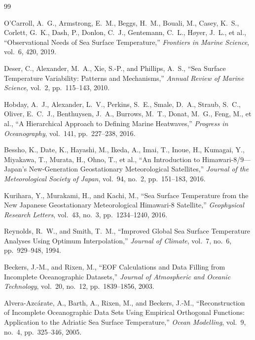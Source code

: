 \documentclass[12pt,reqno]{amsart}
\begin{document}
%
\renewcommand\refname{\vskip -1cm}


\begin{thebibliography}{99}


O'Carroll, A.~G., Armstrong, E.~M., Beggs, H.~M., Bouali, M., Casey, K.~S., Corlett, G.~K., Dash, P., Donlon, C.~J., Gentemann, C.~L., H{\o}yer, J.~L., et al.,
``Observational Needs of Sea Surface Temperature,''
\textit{Frontiers in Marine Science}, vol.~6, 420, 2019.

Deser, C., Alexander, M.~A., Xie, S.-P., and Phillips, A.~S.,
``Sea Surface Temperature Variability: Patterns and Mechanisms,''
\textit{Annual Review of Marine Science}, vol.~2, pp.~115--143, 2010.

Hobday, A.~J., Alexander, L.~V., Perkins, S.~E., Smale, D.~A., Straub, S.~C., Oliver, E.~C.~J., Benthuysen, J.~A., Burrows, M.~T., Donat, M.~G., Feng, M., et al.,
``A Hierarchical Approach to Defining Marine Heatwaves,''
\textit{Progress in Oceanography}, vol.~141, pp.~227--238, 2016.

Bessho, K., Date, K., Hayashi, M., Ikeda, A., Imai, T., Inoue, H., Kumagai, Y., Miyakawa, T., Murata, H., Ohno, T., et al.,
``An Introduction to Himawari-8/9---Japan's New-Generation Geostationary Meteorological Satellites,''
\textit{Journal of the Meteorological Society of Japan}, vol.~94, no.~2, pp.~151--183, 2016.

Kurihara, Y., Murakami, H., and Kachi, M.,
``Sea Surface Temperature from the New Japanese Geostationary Meteorological Himawari-8 Satellite,''
\textit{Geophysical Research Letters}, vol.~43, no.~3, pp.~1234--1240, 2016.

Reynolds, R.~W., and Smith, T.~M.,
``Improved Global Sea Surface Temperature Analyses Using Optimum Interpolation,''
\textit{Journal of Climate}, vol.~7, no.~6, pp.~929--948, 1994.

Beckers, J.-M., and Rixen, M.,
``EOF Calculations and Data Filling from Incomplete Oceanographic Datasets,''
\textit{Journal of Atmospheric and Oceanic Technology}, vol.~20, no.~12, pp.~1839--1856, 2003.

Alvera-Azc\'arate, A., Barth, A., Rixen, M., and Beckers, J.-M.,
``Reconstruction of Incomplete Oceanographic Data Sets Using Empirical Orthogonal Functions: Application to the Adriatic Sea Surface Temperature,''
\textit{Ocean Modelling}, vol.~9, no.~4, pp.~325--346, 2005.


\end{thebibliography}
\end{document}

